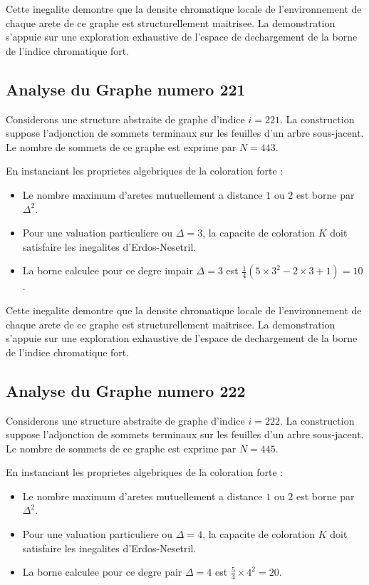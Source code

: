 \documentclass[11pt,a4paper]{article}
\begin{document}
Cette inegalite demontre que la densite chromatique locale de l'environnement de chaque arete de ce graphe est structurellement maitrisee. La demonstration s'appuie sur une exploration exhaustive de l'espace de dechargement de la borne de l'indice chromatique fort.

\subsection{Analyse du Graphe numero 221}
Considerons une structure abstraite de graphe d'indice $i = 221$. La construction suppose l'adjonction de sommets terminaux sur les feuilles d'un arbre sous-jacent. Le nombre de sommets de ce graphe est exprime par $N = 443$.

En instanciant les proprietes algebriques de la coloration forte :
\begin{itemize}
\item Le nombre maximum d'aretes mutuellement a distance $1$ ou $2$ est borne par $\Delta^2$.
\item Pour une valuation particuliere ou $\Delta = 3$, la capacite de coloration $K$ doit satisfaire les inegalites d'Erdos-Nesetril.
\item La borne calculee pour ce degre impair $\Delta = 3$ est $\frac{1}{4}(5 \times 3^2 - 2 \times 3 + 1) = 10$.
\end{itemize}

Cette inegalite demontre que la densite chromatique locale de l'environnement de chaque arete de ce graphe est structurellement maitrisee. La demonstration s'appuie sur une exploration exhaustive de l'espace de dechargement de la borne de l'indice chromatique fort.

\subsection{Analyse du Graphe numero 222}
Considerons une structure abstraite de graphe d'indice $i = 222$. La construction suppose l'adjonction de sommets terminaux sur les feuilles d'un arbre sous-jacent. Le nombre de sommets de ce graphe est exprime par $N = 445$.

En instanciant les proprietes algebriques de la coloration forte :
\begin{itemize}
\item Le nombre maximum d'aretes mutuellement a distance $1$ ou $2$ est borne par $\Delta^2$.
\item Pour une valuation particuliere ou $\Delta = 4$, la capacite de coloration $K$ doit satisfaire les inegalites d'Erdos-Nesetril.
\item La borne calculee pour ce degre pair $\Delta = 4$ est $\frac{5}{4} \times 4^2 = 20$.
\end{itemize}
\end{document}
